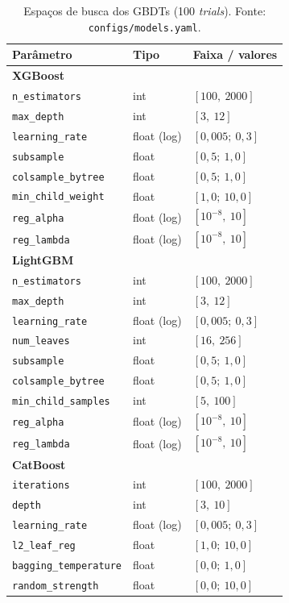 \begin{table}[htbp]
\centering\footnotesize
\caption[Espaços de busca --- GBDTs]{Espaços de busca dos GBDTs
(100 \emph{trials}). Fonte: \texttt{configs/\allowbreak models.\allowbreak yaml}.}
\label{tab:app-busca-gbdt}
\begin{tabular}{lll}
\toprule
Parâmetro & Tipo & Faixa / valores \\
\midrule
\multicolumn{3}{l}{\textbf{XGBoost}} \\
\texttt{n\_estimators}      & int   & $[100,\ 2000]$ \\
\texttt{max\_depth}         & int   & $[3,\ 12]$ \\
\texttt{learning\_rate}     & float (log) & $[0{,}005;\ 0{,}3]$ \\
\texttt{subsample}          & float & $[0{,}5;\ 1{,}0]$ \\
\texttt{colsample\_\allowbreak bytree}  & float & $[0{,}5;\ 1{,}0]$ \\
\texttt{min\_\allowbreak child\_\allowbreak weight} & float & $[1{,}0;\ 10{,}0]$ \\
\texttt{reg\_alpha}         & float (log) & $[10^{-8},\ 10]$ \\
\texttt{reg\_lambda}        & float (log) & $[10^{-8},\ 10]$ \\
\midrule
\multicolumn{3}{l}{\textbf{LightGBM}} \\
\texttt{n\_estimators}       & int   & $[100,\ 2000]$ \\
\texttt{max\_depth}          & int   & $[3,\ 12]$ \\
\texttt{learning\_rate}      & float (log) & $[0{,}005;\ 0{,}3]$ \\
\texttt{num\_leaves}         & int   & $[16,\ 256]$ \\
\texttt{subsample}           & float & $[0{,}5;\ 1{,}0]$ \\
\texttt{colsample\_\allowbreak bytree}   & float & $[0{,}5;\ 1{,}0]$ \\
\texttt{min\_\allowbreak child\_\allowbreak samples} & int   & $[5,\ 100]$ \\
\texttt{reg\_alpha}          & float (log) & $[10^{-8},\ 10]$ \\
\texttt{reg\_lambda}         & float (log) & $[10^{-8},\ 10]$ \\
\midrule
\multicolumn{3}{l}{\textbf{CatBoost}} \\
\texttt{iterations}           & int   & $[100,\ 2000]$ \\
\texttt{depth}                & int   & $[3,\ 10]$ \\
\texttt{learning\_rate}       & float (log) & $[0{,}005;\ 0{,}3]$ \\
\texttt{l2\_leaf\_reg}        & float & $[1{,}0;\ 10{,}0]$ \\
\texttt{bagging\_\allowbreak temperature} & float & $[0{,}0;\ 1{,}0]$ \\
\texttt{random\_\allowbreak strength}     & float & $[0{,}0;\ 10{,}0]$ \\
\bottomrule
\end{tabular}
\end{table}

